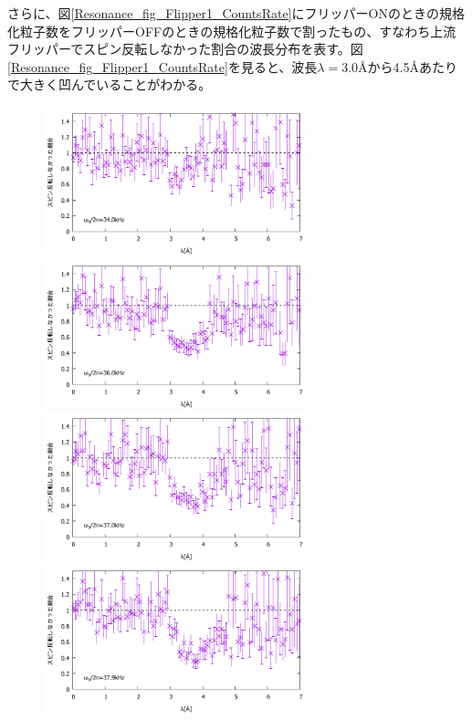 さらに、図\ref{Resonance_fig_Flipper1_CountsRate}にフリッパーONのときの規格化粒子数をフリッパーOFFのときの規格化粒子数で割ったもの、すなわち上流フリッパーでスピン反転しなかった割合の波長分布を表す。図\ref{Resonance_fig_Flipper1_CountsRate}を見ると、波長$\lambda=$3.0{\AA}から4.5{\AA}あたりで大きく凹んでいることがわかる。
\begin{figure}[h]
\includegraphics[height=4.3cm]{resonance/analysis/Flipper1_CountsRate_340kHz.pdf}
\includegraphics[height=4.3cm]{resonance/analysis/Flipper1_CountsRate_360kHz.pdf}\\
\includegraphics[height=4.3cm]{resonance/analysis/Flipper1_CountsRate_370kHz.pdf}
\includegraphics[height=4.3cm]{resonance/analysis/Flipper1_CountsRate_379kHz.pdf}\\

\end{figure}
